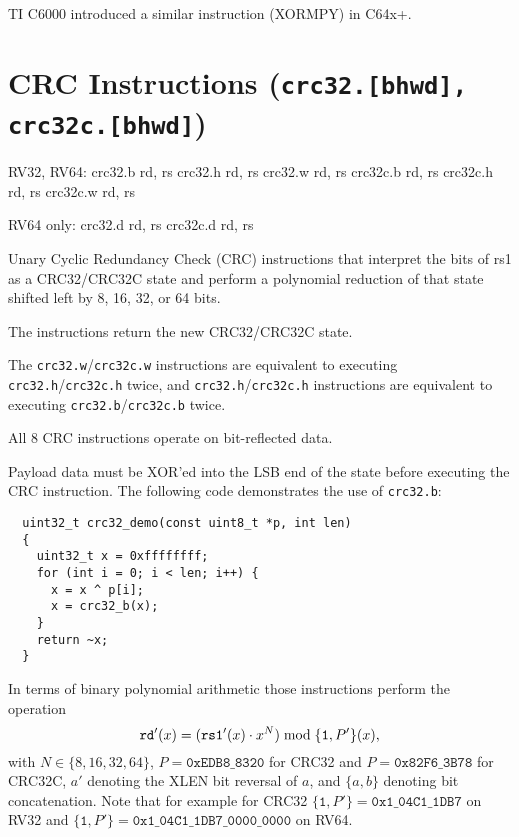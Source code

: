 TI C6000 introduced a similar instruction (XORMPY) in C64x+.~\cite{c64xp}


\section{CRC Instructions (\texttt{crc32.[bhwd], crc32c.[bhwd]})}

\begin{rvb}
  RV32, RV64:
    crc32.b rd, rs
    crc32.h rd, rs
    crc32.w rd, rs
    crc32c.b rd, rs
    crc32c.h rd, rs
    crc32c.w rd, rs

  RV64 only:
    crc32.d rd, rs
    crc32c.d rd, rs
\end{rvb}

Unary Cyclic Redundancy Check (CRC) instructions that interpret the bits of rs1
as a CRC32/CRC32C state and perform a polynomial reduction of that state
shifted left by 8, 16, 32, or 64 bits.

The instructions return the new CRC32/CRC32C state.

The \texttt{crc32.w}/\texttt{crc32c.w} instructions are equivalent to executing
\texttt{crc32.h}/\texttt{crc32c.h} twice, and \texttt{crc32.h}/\texttt{crc32c.h}
instructions are equivalent to executing \texttt{crc32.b}/\texttt{crc32c.b}
twice.

All 8 CRC instructions operate on bit-reflected data.



Payload data must be XOR'ed into the LSB end of the state before executing the
CRC instruction. The following code demonstrates the use of \texttt{crc32.b}:

\begin{minipage}{\linewidth}
\begin{verbatim}
  uint32_t crc32_demo(const uint8_t *p, int len)
  {
    uint32_t x = 0xffffffff;
    for (int i = 0; i < len; i++) {
      x = x ^ p[i];
      x = crc32_b(x);
    }
    return ~x;
  }
\end{verbatim}
\end{minipage}

In terms of binary polynomial arithmetic those instructions perform the operation
$$ \texttt{rd}'(x) = (\texttt{rs1}'(x) \cdot x^N) \; \textrm{mod} \; \{\texttt{1}, P'\}(x)\textrm, $$
with $N \in \{8, 16, 32, 64\}$,
$P = \texttt{0xEDB8\_8320}$ for CRC32 and $P = \texttt{0x82F6\_3B78}$ for CRC32C,
$a'$ denoting the XLEN bit reversal of $a$,
and $\{a, b\}$ denoting bit concatenation.
Note that for example for CRC32 $\{\texttt{1}, P'\} = \texttt{0x1\_04C1\_1DB7}$
on RV32 and $\{\texttt{1}, P'\} = \texttt{0x1\_04C1\_1DB7\_0000\_0000}$ on RV64.

